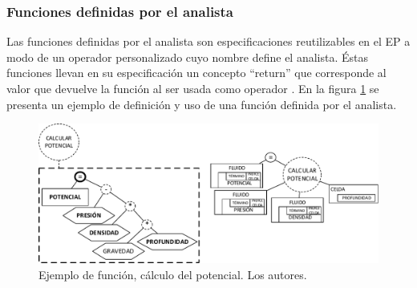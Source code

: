 \subsubsection{Funciones definidas por el analista}
Las funciones definidas por el analista son especificaciones reutilizables en el EP a modo de un operador personalizado cuyo nombre define el analista. Éstas funciones llevan en su especificación un concepto ``return'' que corresponde al valor que devuelve la función al ser usada como operador \citep{JCalle}. En la figura \ref{fig:Potencial} se presenta un ejemplo de definición y uso de una función definida por el analista.

\begin{figure}[h]
	\centering%
	\includegraphics[scale=0.8]{Fig/EjFuncion.pdf}%
	\caption[Ejemplo de función, cálculo del potencial.]{Ejemplo de función, cálculo del potencial. Los autores.} \label{fig:Potencial}
\end{figure}

